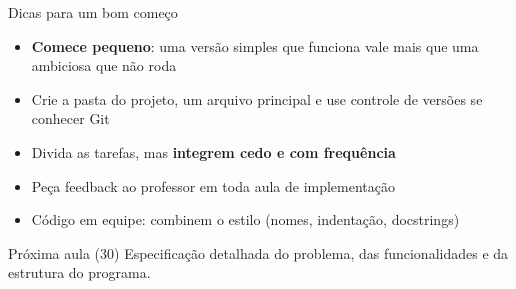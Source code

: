 \documentclass[aspectratio=169,10pt,t]{beamer}
\begin{document}
\begin{frame}{Dicas para um bom começo}
  \begin{itemize}
    \item \textbf{Comece pequeno}: uma versão simples que funciona vale mais que uma ambiciosa que não roda
    \item Crie a pasta do projeto, um arquivo principal e \alert{use controle de versões} se conhecer Git
    \item Divida as tarefas, mas \textbf{integrem cedo e com frequência}
    \item Peça feedback ao professor em toda aula de implementação
    \item Código em equipe: combinem o estilo (nomes, indentação, docstrings)
  \end{itemize}
  \begin{exampleblock}{Próxima aula (30)}
    Especificação detalhada do problema, das funcionalidades e da estrutura do programa.
  \end{exampleblock}
\end{frame}
\end{document}
